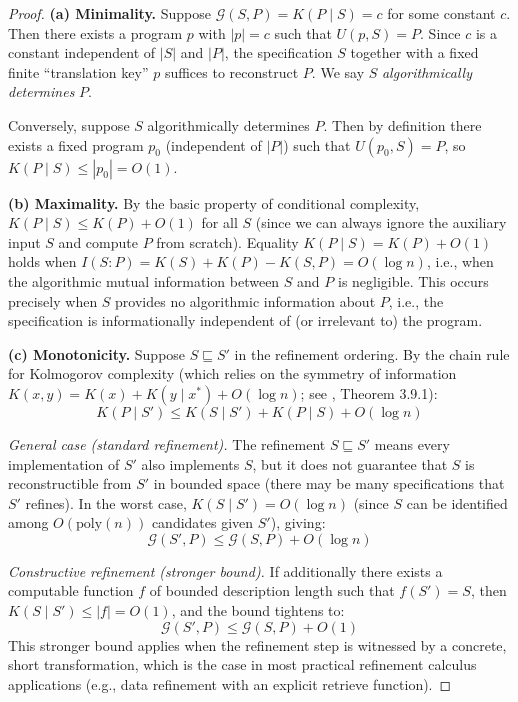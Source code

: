 \documentclass[11pt, a4paper, logo, copyright]{googledeepmind}
\begin{document}
\begin{proof}
\textbf{(a) Minimality.} Suppose $\mathcal{G}(S, P) = K(P \mid S) = c$ for some constant $c$. Then there exists a program $p$ with $|p| = c$ such that $U(p, S) = P$. Since $c$ is a constant independent of $|S|$ and $|P|$, the specification $S$ together with a fixed finite ``translation key'' $p$ suffices to reconstruct $P$. We say $S$ \emph{algorithmically determines} $P$.

Conversely, suppose $S$ algorithmically determines $P$. Then by definition there exists a fixed program $p_0$ (independent of $|P|$) such that $U(p_0, S) = P$, so $K(P \mid S) \leq |p_0| = O(1)$.

\textbf{(b) Maximality.} By the basic property of conditional complexity, $K(P \mid S) \leq K(P) + O(1)$ for all $S$ (since we can always ignore the auxiliary input $S$ and compute $P$ from scratch). Equality $K(P \mid S) = K(P) + O(1)$ holds when $I(S : P) = K(S) + K(P) - K(S, P) = O(\log n)$, i.e., when the algorithmic mutual information between $S$ and $P$ is negligible. This occurs precisely when $S$ provides no algorithmic information about $P$, i.e., the specification is informationally independent of (or irrelevant to) the program.

\textbf{(c) Monotonicity.} Suppose $S \sqsubseteq S'$ in the refinement ordering. By the chain rule for Kolmogorov complexity (which relies on the symmetry of information $K(x, y) = K(x) + K(y \mid x^*) + O(\log n)$; see \citealp{li2019introduction}, Theorem 3.9.1):
\[
K(P \mid S') \leq K(S \mid S') + K(P \mid S) + O(\log n)
\]

\emph{General case (standard refinement).} The refinement $S \sqsubseteq S'$ means every implementation of $S'$ also implements $S$, but it does not guarantee that $S$ is reconstructible from $S'$ in bounded space (there may be many specifications that $S'$ refines). In the worst case, $K(S \mid S') = O(\log n)$ (since $S$ can be identified among $O(\text{poly}(n))$ candidates given $S'$), giving:
\[
\mathcal{G}(S', P) \leq \mathcal{G}(S, P) + O(\log n)
\]

\emph{Constructive refinement (stronger bound).} If additionally there exists a computable function $f$ of bounded description length such that $f(S') = S$, then $K(S \mid S') \leq |f| = O(1)$, and the bound tightens to:
\[
\mathcal{G}(S', P) \leq \mathcal{G}(S, P) + O(1)
\]
This stronger bound applies when the refinement step is witnessed by a concrete, short transformation, which is the case in most practical refinement calculus applications (e.g., data refinement with an explicit retrieve function).


\end{proof}
\end{document}
